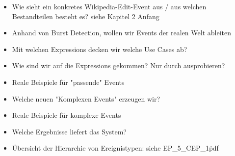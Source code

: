 \begin{itemize}
    \item Wie sieht ein konkretes Wikipedia-Edit-Event aus / aus welchen Bestandteilen besteht es?
        siehe \cite{10.1007978-3-642-36973-5_22} Kapitel 2 Anfang
    \item Anhand von Burst Detection, wollen wir Events der realen Welt ableiten \cite{Zhu:2003:EEB:956750.956789}
    \item Mit welchen Expressions decken wir welche Use Cases ab?
    \item Wie sind wir auf die Expressions gekommen? Nur durch ausprobieren?
    \item Reale Beispiele für "passende" Events
    \item Welche neuen "Komplexen Events" erzeugen wir?
    \item Reale Beispiele für komplexe Events
    \item Welche Ergebnisse liefert das System?
    \item Übersicht der Hierarchie von Ereignistypen: siehe EP\_5\_CEP\_1\.pdf
\end{itemize}